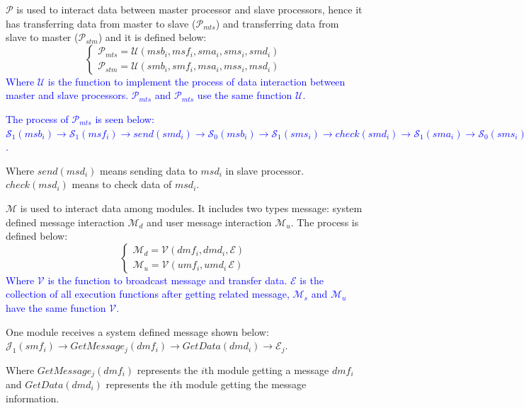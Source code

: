 \documentclass[journal,UTF8]{IEEEtran}
\begin{document}
$\mathcal{P}$ is used to interact data between master processor and slave processors, hence it has transferring data from master to slave ($\mathcal{P}_{mts}$) and transferring data from slave to master ($\mathcal{P}_{stm}$) and it is defined below:
 \begin{equation}
 \left\{
 \begin{array}{l}
 \mathcal{P}_{mts} = \mathcal{U} (msb_i,msf_i,sma_i,sms_i,smd_i)\\
 \mathcal{P}_{stm} = \mathcal{U} (smb_i,smf_i,msa_i,mss_i,msd_i)
 \end{array}
 \right.
 \end{equation}
\textcolor{blue}{Where $\mathcal{U}$ is the function to implement the process of data interaction between master and slave processors. $\mathcal{P}_{mts}$ and $\mathcal{P}_{mts}$ use the same function $\mathcal{U}$.}

\textcolor{blue}{The process of $\mathcal{P}_{mts}$ is seen below:
 $\mathcal{S}_1(msb_i)\to\mathcal{S}_1(msf_i)\to send(smd_i)\to\mathcal{S}_0(msb_i)\to\mathcal{S}_1(sms_i)\to check(smd_i)\to\mathcal{S}_1(sma_i)\to\mathcal{S}_0(sms_i)\to\mathcal{S}_0(sma_i)\to\mathcal{S}_0(msf_i)$.}
 
Where $send(msd_i)$ means sending data to $msd_i$ in slave processor. $check(msd_i)$ means to check data of $msd_i$.
 
$\mathcal{M}$ is used to interact data among modules. It includes two types message: system defined message interaction $\mathcal{M}_{d}$ and user message interaction $\mathcal{M}_{u}$. The process is defined below:
 \begin{equation}
\left\{
\begin{array}{l}
\mathcal{M}_{d} = \mathcal{V} (dmf_i,dmd_i,\mathcal{E})\\
\mathcal{M}_{u} = \mathcal{V} (umf_i,umd_i\,\mathcal{E})
\end{array}
\right.
\end{equation}
\textcolor{blue}{Where $\mathcal{V}$ is the function to broadcast message and transfer data. $\mathcal{E}$ is the collection of all execution functions after getting related message, $\mathcal{M}_{s}$ and $\mathcal{M}_{u}$ have the same function $\mathcal{V}$.}

One module receives a system defined message shown below:
$\mathcal{J}_1(smf_i)\to GetMessage_{j}(dmf_i)\to GetData(dmd_i)\to\mathcal{E}_j$.

 Where $GetMessage_{j}(dmf_i)$ represents the $i$th module getting a message $dmf_i$ and $GetData(dmd_i)$ represents the $i$th module getting the message information.
\end{document}
